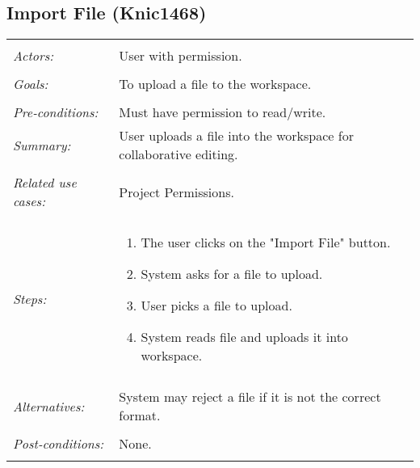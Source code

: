 \documentclass[11pt]{report}
\begin{document}
\subsection{Import File (Knic1468)}
\begin{tabular}{ p{2cm} p{12cm} }
\hline
\\
\textit{Actors:} & User with permission.\\
\\
\textit{Goals:} & To upload a file to the workspace. \\
\\
\textit{Pre-conditions:} & Must have permission to read/write. 
\\
\textit{Summary:} & User uploads a file into the workspace for collaborative editing. \\
\\
\textit{Related use cases:} & Project Permissions. \\
\\
\textit{Steps:} & \begin{enumerate}
 \item The user clicks on the "Import File" button. 
 \item System asks for a file to upload. 
 \item User picks a file to upload. 
 \item System reads file and uploads it into workspace. 
 \end{enumerate}\\
 \\
 \textit{Alternatives:} & System may reject a file if it is not the correct format.\\
 \\
 \textit{Post-conditions:} & None. \\
 \\
\hline
\end{tabular}
\end{document}
